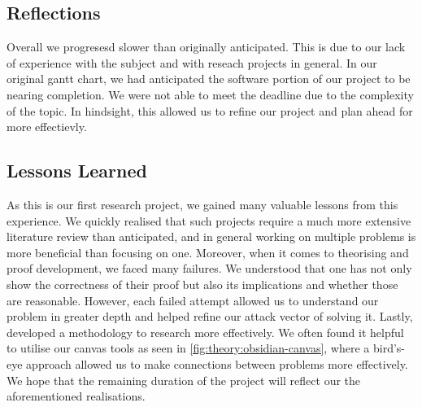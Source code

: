 \subsection{Reflections}

Overall we progresesd slower than originally anticipated. This 
is due to our lack of experience with the subject and with reseach projects in general.
In our original gantt chart, we had anticipated the software portion of our project
to be nearing completion. We were not able to meet the deadline due to the complexity
of the topic. In hindsight, this allowed us to refine our project and plan ahead
for more effectievly. 

\subsection{Lessons Learned}

As this is our first research project, we gained many valuable lessons from this experience.
We quickly realised that such projects require a much more extensive literature review than anticipated, 
and in general working on multiple problems is more beneficial than focusing on one.
Moreover, when it comes to theorising and proof development, we faced many failures.
We understood that one has not only show the correctness of their proof but also its implications
and whether those are reasonable.
However, each failed attempt allowed us to understand our problem in greater depth and
helped refine our attack vector of solving it.
Lastly, developed a methodology to research more effectively. We often found it helpful
to utilise our canvas tools as seen in \ref{fig:theory:obsidian-canvas}, where
a bird's-eye approach allowed us to make connections between problems more effectively.
We hope that the remaining duration of the project will reflect our the aforementioned realisations.



